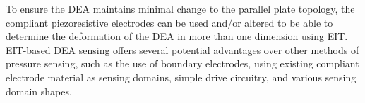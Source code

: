     To ensure the DEA maintains minimal change to the parallel plate topology, the compliant piezoresistive electrodes can be used and/or altered to be able to determine the deformation of the DEA in more than one dimension using EIT. EIT-based DEA sensing offers several potential advantages over other methods of pressure sensing, such as the use of boundary electrodes, using existing compliant electrode material as sensing domains, simple drive circuitry, and various sensing domain shapes.
	
	
	
	
	
	

